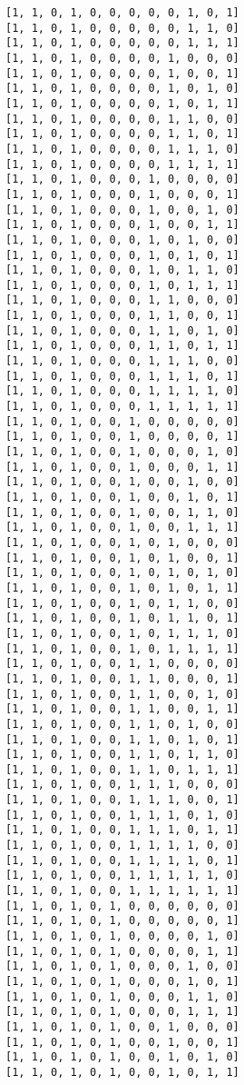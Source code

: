 \documentclass[11pt]{article}
\begin{document}
\begin{Verbatim}[commandchars=\\\{\}]
[1, 1, 0, 1, 0, 0, 0, 0, 0, 1, 0, 1]
[1, 1, 0, 1, 0, 0, 0, 0, 0, 1, 1, 0]
[1, 1, 0, 1, 0, 0, 0, 0, 0, 1, 1, 1]
[1, 1, 0, 1, 0, 0, 0, 0, 1, 0, 0, 0]
[1, 1, 0, 1, 0, 0, 0, 0, 1, 0, 0, 1]
[1, 1, 0, 1, 0, 0, 0, 0, 1, 0, 1, 0]
[1, 1, 0, 1, 0, 0, 0, 0, 1, 0, 1, 1]
[1, 1, 0, 1, 0, 0, 0, 0, 1, 1, 0, 0]
[1, 1, 0, 1, 0, 0, 0, 0, 1, 1, 0, 1]
[1, 1, 0, 1, 0, 0, 0, 0, 1, 1, 1, 0]
[1, 1, 0, 1, 0, 0, 0, 0, 1, 1, 1, 1]
[1, 1, 0, 1, 0, 0, 0, 1, 0, 0, 0, 0]
[1, 1, 0, 1, 0, 0, 0, 1, 0, 0, 0, 1]
[1, 1, 0, 1, 0, 0, 0, 1, 0, 0, 1, 0]
[1, 1, 0, 1, 0, 0, 0, 1, 0, 0, 1, 1]
[1, 1, 0, 1, 0, 0, 0, 1, 0, 1, 0, 0]
[1, 1, 0, 1, 0, 0, 0, 1, 0, 1, 0, 1]
[1, 1, 0, 1, 0, 0, 0, 1, 0, 1, 1, 0]
[1, 1, 0, 1, 0, 0, 0, 1, 0, 1, 1, 1]
[1, 1, 0, 1, 0, 0, 0, 1, 1, 0, 0, 0]
[1, 1, 0, 1, 0, 0, 0, 1, 1, 0, 0, 1]
[1, 1, 0, 1, 0, 0, 0, 1, 1, 0, 1, 0]
[1, 1, 0, 1, 0, 0, 0, 1, 1, 0, 1, 1]
[1, 1, 0, 1, 0, 0, 0, 1, 1, 1, 0, 0]
[1, 1, 0, 1, 0, 0, 0, 1, 1, 1, 0, 1]
[1, 1, 0, 1, 0, 0, 0, 1, 1, 1, 1, 0]
[1, 1, 0, 1, 0, 0, 0, 1, 1, 1, 1, 1]
[1, 1, 0, 1, 0, 0, 1, 0, 0, 0, 0, 0]
[1, 1, 0, 1, 0, 0, 1, 0, 0, 0, 0, 1]
[1, 1, 0, 1, 0, 0, 1, 0, 0, 0, 1, 0]
[1, 1, 0, 1, 0, 0, 1, 0, 0, 0, 1, 1]
[1, 1, 0, 1, 0, 0, 1, 0, 0, 1, 0, 0]
[1, 1, 0, 1, 0, 0, 1, 0, 0, 1, 0, 1]
[1, 1, 0, 1, 0, 0, 1, 0, 0, 1, 1, 0]
[1, 1, 0, 1, 0, 0, 1, 0, 0, 1, 1, 1]
[1, 1, 0, 1, 0, 0, 1, 0, 1, 0, 0, 0]
[1, 1, 0, 1, 0, 0, 1, 0, 1, 0, 0, 1]
[1, 1, 0, 1, 0, 0, 1, 0, 1, 0, 1, 0]
[1, 1, 0, 1, 0, 0, 1, 0, 1, 0, 1, 1]
[1, 1, 0, 1, 0, 0, 1, 0, 1, 1, 0, 0]
[1, 1, 0, 1, 0, 0, 1, 0, 1, 1, 0, 1]
[1, 1, 0, 1, 0, 0, 1, 0, 1, 1, 1, 0]
[1, 1, 0, 1, 0, 0, 1, 0, 1, 1, 1, 1]
[1, 1, 0, 1, 0, 0, 1, 1, 0, 0, 0, 0]
[1, 1, 0, 1, 0, 0, 1, 1, 0, 0, 0, 1]
[1, 1, 0, 1, 0, 0, 1, 1, 0, 0, 1, 0]
[1, 1, 0, 1, 0, 0, 1, 1, 0, 0, 1, 1]
[1, 1, 0, 1, 0, 0, 1, 1, 0, 1, 0, 0]
[1, 1, 0, 1, 0, 0, 1, 1, 0, 1, 0, 1]
[1, 1, 0, 1, 0, 0, 1, 1, 0, 1, 1, 0]
[1, 1, 0, 1, 0, 0, 1, 1, 0, 1, 1, 1]
[1, 1, 0, 1, 0, 0, 1, 1, 1, 0, 0, 0]
[1, 1, 0, 1, 0, 0, 1, 1, 1, 0, 0, 1]
[1, 1, 0, 1, 0, 0, 1, 1, 1, 0, 1, 0]
[1, 1, 0, 1, 0, 0, 1, 1, 1, 0, 1, 1]
[1, 1, 0, 1, 0, 0, 1, 1, 1, 1, 0, 0]
[1, 1, 0, 1, 0, 0, 1, 1, 1, 1, 0, 1]
[1, 1, 0, 1, 0, 0, 1, 1, 1, 1, 1, 0]
[1, 1, 0, 1, 0, 0, 1, 1, 1, 1, 1, 1]
[1, 1, 0, 1, 0, 1, 0, 0, 0, 0, 0, 0]
[1, 1, 0, 1, 0, 1, 0, 0, 0, 0, 0, 1]
[1, 1, 0, 1, 0, 1, 0, 0, 0, 0, 1, 0]
[1, 1, 0, 1, 0, 1, 0, 0, 0, 0, 1, 1]
[1, 1, 0, 1, 0, 1, 0, 0, 0, 1, 0, 0]
[1, 1, 0, 1, 0, 1, 0, 0, 0, 1, 0, 1]
[1, 1, 0, 1, 0, 1, 0, 0, 0, 1, 1, 0]
[1, 1, 0, 1, 0, 1, 0, 0, 0, 1, 1, 1]
[1, 1, 0, 1, 0, 1, 0, 0, 1, 0, 0, 0]
[1, 1, 0, 1, 0, 1, 0, 0, 1, 0, 0, 1]
[1, 1, 0, 1, 0, 1, 0, 0, 1, 0, 1, 0]
[1, 1, 0, 1, 0, 1, 0, 0, 1, 0, 1, 1]

\end{Verbatim}
\end{document}
